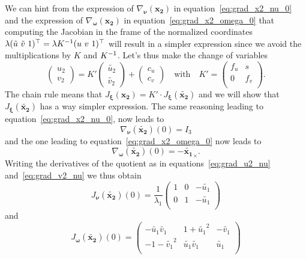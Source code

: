 We can hint from the expression of $\nabla_{\bm{\nu}}(\bm{x_2})$
in equation~\ref{eq:grad_x2_nu_0} and the expression of
$\nabla_{\bm{\omega}}(\bm{x_2})$ in equation~\ref{eq:grad_x2_omega_0}
that computing the Jacobian in the frame of
the normalized coordinates
$\lambda (\tilde{u}\ \tilde{v}\ 1)^{\top} = \lambda K^{-1} (u\ v\ 1)^{\top}$
will result in a simpler expression since we avoid the multiplications
by $K$ and $K^{-1}$.
Let's thus make the change of variables
\[
	\begin{pmatrix} u_2 \\ v_2 \end{pmatrix}
		= K' \begin{pmatrix} \tilde{u_2} \\ \tilde{v_2} \end{pmatrix}
			+ \begin{pmatrix} c_u \\ c_v \end{pmatrix}
	\quad \text{with} \quad
	K' = \begin{pmatrix}
		f_u & s \\
		0 & f_v \\
	\end{pmatrix}.
\]
The chain rule means that
$J_{\bm{\xi}}(\bm{x_2}) = K' \cdot J_{\bm{\xi}}(\bm{\tilde{x_2}})$
and we will show that $J_{\bm{\xi}}(\bm{\tilde{x_2}})$ has a way simpler expression.
The same reasoning leading to equation~\ref{eq:grad_x2_nu_0},
now leads to
\begin{equation}
\label{eq:grad_x2_nu_0_norm}
	\nabla_{\bm{\nu}}(\bm{\tilde{x_2}})(0) = I_3
\end{equation}
and the one leading to equation~\ref{eq:grad_x2_omega_0} now leads to
\begin{equation}
\label{eq:grad_x2_omega_0_norm}
	\nabla_{\bm{\omega}}(\bm{\tilde{x_2}})(0)
		= -{\bm{\tilde{x_1}}}_{\times}.
\end{equation}
Writing the derivatives of the quotient as in
equations~\ref{eq:grad_u2_nu} and~\ref{eq:grad_v2_nu} we thus obtain
\begin{equation}
\label{eq:jac_2x3_nu_norm}
	\boxed{J_{\bm{\nu}}(\bm{\tilde{x_2}})(0) =
		\frac{1}{\lambda_1} \begin{pmatrix}
			1 & 0   & -\tilde{u_1} \\
			0 & 1   & -\tilde{u_1} \\
		\end{pmatrix}}
\end{equation}
and
\begin{equation}
\label{eq:jac_2x3_omega_norm}
	\boxed{J_{\bm{\omega}}(\bm{\tilde{x_2}})(0) =
		\begin{pmatrix}
			-\tilde{u_1}\tilde{v_1} & 1 + {\tilde{u_1}}^2 & -\tilde{v_1} \\
			-1 - {\tilde{v_1}}^2 & \tilde{u_1}\tilde{v_1} & \tilde{u_1} \\
		\end{pmatrix}}
\end{equation}
